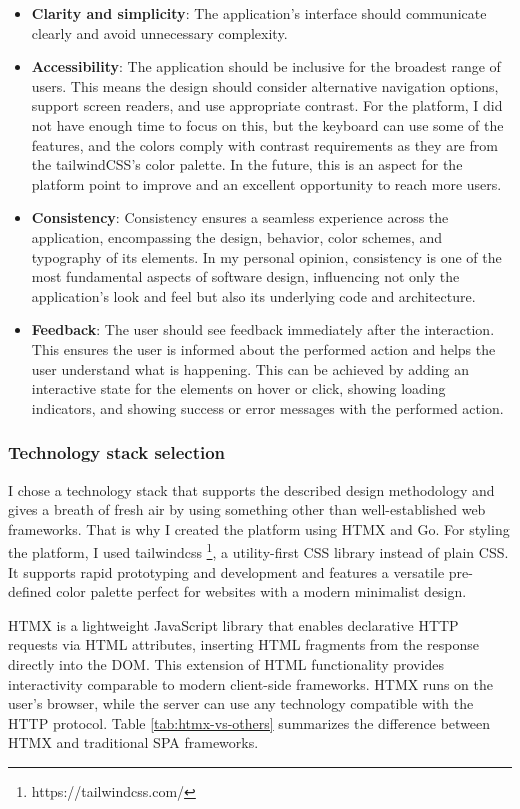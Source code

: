 \begin{itemize}
\item \textbf{Clarity and simplicity}: The application's interface should communicate clearly and avoid unnecessary complexity.
\item \textbf{Accessibility}: The application should be inclusive for the broadest range of users. This means the design should consider alternative navigation options, support screen readers, and use appropriate contrast. For the platform, I did not have enough time to focus on this, but the keyboard can use some of the features, and the colors comply with contrast requirements as they are from the tailwindCSS's color palette. In the future, this is an aspect for the platform point to improve and an excellent opportunity to reach more users.
\item \textbf{Consistency}: Consistency ensures a seamless experience across the application, encompassing the design, behavior, color schemes, and typography of its elements. In my personal opinion, consistency is one of the most fundamental aspects of software design, influencing not only the application's look and feel but also its underlying code and architecture.
\item \textbf{Feedback}: The user should see feedback immediately after the interaction. This ensures the user is informed about the performed action and helps the user understand what is happening. This can be achieved by adding an interactive state for the elements on hover or click, showing loading indicators, and showing success or error messages with the performed action.
\end{itemize}

\subsubsection{Technology stack selection}

I chose a technology stack that supports the described design methodology and gives a breath of fresh air by using something other than well-established web frameworks. That is why I created the platform using HTMX and Go. For styling the platform, I used tailwindcss \footnote{https://tailwindcss.com/}, a utility-first CSS library instead of plain CSS. It supports rapid prototyping and development and features a versatile pre-defined color palette perfect for websites with a modern minimalist design.

HTMX is a lightweight JavaScript library that enables declarative HTTP requests via HTML attributes, inserting HTML fragments from the response directly into the DOM. This extension of HTML functionality provides interactivity comparable to modern client-side frameworks. HTMX runs on the user's browser, while the server can use any technology compatible with the HTTP protocol. Table \ref{tab:htmx-vs-others} summarizes the difference between HTMX and traditional SPA frameworks.

